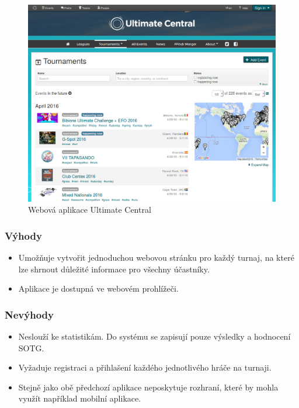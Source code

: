 \begin{figure}[ht!]
\centering
\includegraphics[width=130mm]{./images/ultimate-central.png}
\caption{Webová aplikace Ultimate Central\label{overflow}}
\label{fig:uwsgi}
\end{figure}

\subsubsection*{Výhody}
\begin{itemize}
  \item Umožňuje vytvořit jednoduchou webovou stránku pro každý turnaj, na které lze shrnout důležité informace pro všechny účastníky.
  \item Aplikace je dostupná ve webovém prohlížeči.
\end{itemize}

\subsubsection*{Nevýhody}
\begin{itemize}
  \item Neslouží ke statistikám. Do systému se zapisují pouze výsledky a hodnocení SOTG.
  \item Vyžaduje registraci a přihlašení každého jednotlivého hráče na turnaji.
  \item Stejně jako obě předchozí aplikace neposkytuje rozhraní, které by mohla využít například mobilní aplikace.
\end{itemize}

